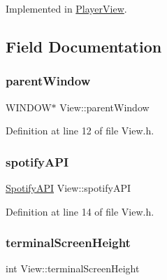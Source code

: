 Implemented in \mbox{\hyperlink{class_player_view_aa0f641da279524437a48edbaf088414c}{Player\+View}}.



\subsection{Field Documentation}
\mbox{\label{class_view_a4a72723c795f9cec173ed1ebb6d5164c}} 
\subsubsection{\texorpdfstring{parent\+Window}{parentWindow}}
{\footnotesize\ttfamily W\+I\+N\+D\+OW$\ast$ View\+::parent\+Window\hspace{0.3cm}{\ttfamily [protected]}}



Definition at line 12 of file View.\+h.

\mbox{\label{class_view_ab8fa3bb31350226f8a3abf3e2c80a9c3}} 
\subsubsection{\texorpdfstring{spotify\+A\+PI}{spotifyAPI}}
{\footnotesize\ttfamily \mbox{\hyperlink{class_spotify_a_p_i}{Spotify\+A\+PI}} View\+::spotify\+A\+PI\hspace{0.3cm}{\ttfamily [protected]}}



Definition at line 14 of file View.\+h.

\mbox{\label{class_view_a8ed04dfb61219cb59b8e77a2f90db244}} 
\subsubsection{\texorpdfstring{terminal\+Screen\+Height}{terminalScreenHeight}}
{\footnotesize\ttfamily int View\+::terminal\+Screen\+Height\hspace{0.3cm}{\ttfamily [protected]}}



